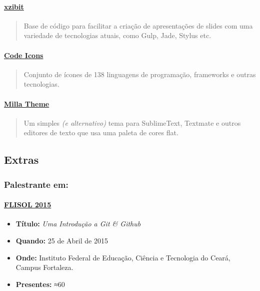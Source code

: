 \documentclass[]{article}
\providecommand{\tightlist}{%
  \setlength{\itemsep}{0pt}\setlength{\parskip}{0pt}}
\let\oldparagraph\paragraph
\renewcommand{\paragraph}[1]{\oldparagraph{#1}\mbox{}}
\begin{document}
\paragraph{\texorpdfstring{\href{https://github.com/mabrasil/xzibit}{xzibit}}{xzibit}}\label{xzibit}

\begin{quote}
Base de código para facilitar a criação de apresentações de slides com
uma variedade de tecnologias atuais, como Gulp, Jade, Stylus etc.
\end{quote}

\paragraph{\texorpdfstring{\href{https://github.com/mabrasil/codeicons}{Code
Icons}}{Code Icons}}\label{code-icons}

\begin{quote}
Conjunto de ícones de 138 linguagens de programação, frameworks e outras
tecnologias.
\end{quote}

\paragraph{\texorpdfstring{\href{https://github.com/mabrasil/milla-theme}{Milla
Theme}}{Milla Theme}}\label{milla-theme}

\begin{quote}
Um simples \emph{(e alternativo)} tema para SublimeText, Textmate e
outros editores de texto que usa uma paleta de cores flat.
\end{quote}

\subsection{Extras}\label{extras}

\subsubsection{Palestrante em:}\label{palestrante-em}

\paragraph{\texorpdfstring{\href{http://flisolce.org/}{FLISOL
2015}}{FLISOL 2015}}\label{flisol-2015}

\begin{itemize}
\tightlist
\item
  \textbf{Título:} \emph{Uma Introdução a Git \& Github}
\item
  \textbf{Quando:} 25 de Abril de 2015
\item
  \textbf{Onde:} Instituto Federal de Educação, Ciência e Tecnologia do
  Ceará, Campus Fortaleza.
\item
  \textbf{Presentes:} ≈60
\end{itemize}
\end{document}
